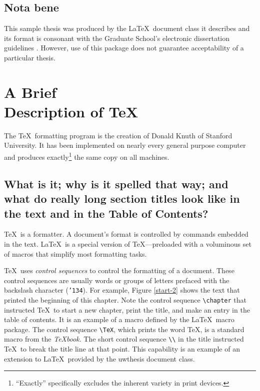 \documentclass [11pt, twoside] {uwthesis}[2012/06/19]
\begin{document}
 
\section{Nota bene}
 
This sample thesis was produced by the \LaTeX\ document class it describes
and its format is consonant with the Graduate School's electronic dissertation guidelines%
\cite{SP}.
However, use of this package does not guarantee acceptability
of a particular thesis.
 
 
 
\chapter{A Brief \texorpdfstring{\\}{} Description of \protect\TeX}
 
The \TeX\ formatting program is the creation of
Donald Knuth of Stanford University.
It has been implemented on nearly every general purpose computer and
produces exactly\footnote{``Exactly'' specifically excludes the
  inherent variety in print devices.}
the same copy on all machines.
 
\section{What is it; why is it spelled that way; 
and what do
really long section titles look like in the text and in the
Table of Contents?}
 
\TeX\ is a formatter.  A document's format is controlled
by commands embedded in the text.
\LaTeX\ is a special version of \TeX---preloaded
with a voluminous set of macros that simplify most
formatting tasks.
 
\TeX\ uses {\it control sequences} to control
the formatting of a document.  These control sequences are usually
words or groups of letters prefaced with the backslash character
({\tt\char'134}).
For example,
Figure \ref{start-2} shows the text that printed the beginning
of this chapter.  Note the control sequence \verb"\chapter" that
instructed \TeX\ to start a new chapter, print the title, and
make an entry in the table of contents.  It is an example
of a macro defined by the \LaTeX\ macro package.
The control sequence \verb"\TeX", which prints the word \TeX,
is a standard macro from the {\it\TeX book}.
The short control sequence \verb"\\" in the title instructed \TeX\ to
break the title line at that point.
This capability is an example of an extension to \LaTeX\
provided by the uwthesis document class.
 
\end{document}
